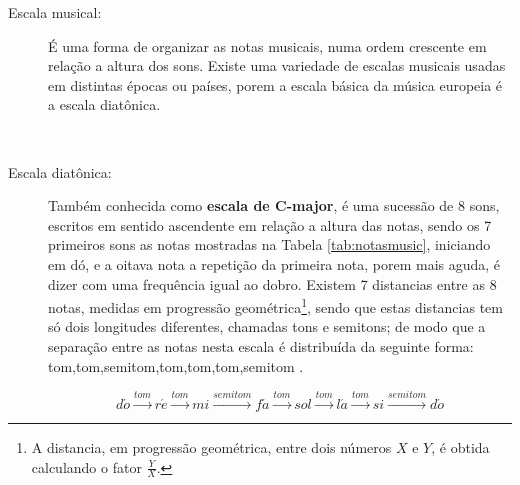 \begin{description}
\item [Escala musical:] \label{sec:pos:Escala}
É uma forma de organizar as notas musicais, numa ordem crescente em relação a altura dos sons.
Existe uma variedade de escalas musicais usadas em distintas épocas ou países, 
porem a escala básica da música europeia é a escala diatônica. \cite[pp. 753]{apel1969harvard}
\begin{example}~
\end{example}



\item [Escala diatônica:] \label{sec:pos:Diatonica}
Também conhecida como \textbf{escala de C-major},
é uma sucessão de 8 sons,  escritos em sentido ascendente em relação a altura das notas, 
sendo os 7 primeiros sons as notas mostradas na Tabela \ref{tab:notasmusic}, iniciando em dó,
e a oitava nota a repetição da primeira nota, 
porem mais aguda, é dizer com uma frequência igual ao dobro.
Existem 7 distancias entre as 8 notas, medidas em progressão geométrica\footnote{A 
distancia, em progressão geométrica, entre dois números $X$ e $Y$, é obtida calculando o fator $\frac{Y}{X}$. }, 
sendo que estas distancias tem só dois longitudes diferentes, chamadas tons e semitons;
de modo que a separação entre as notas nesta escala é distribuída da seguinte forma: 
tom,tom,semitom,tom,tom,tom,semitom \cite[pp. 30]{cardoso1973curso}\cite[pp. 753]{apel1969harvard}.
\begin{example}
\begin{equation*}
d\acute{o}\overset{tom}{\rightarrow}
r\acute{e}\overset{tom}{\rightarrow}
mi\overset{semitom}{\rightarrow}
f\acute{a}\overset{tom}{\rightarrow}
sol\overset{tom}{\rightarrow}
l\acute{a}\overset{tom}{\rightarrow}
si\overset{semitom}{\rightarrow}
d\acute{o}
\end{equation*}
\end{example}


\end{description}
